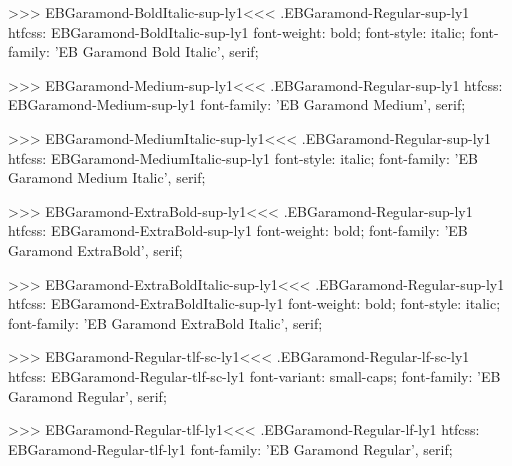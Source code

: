 {{>>>
\<EBGaramond-BoldItalic-sup-ly1\><<<
.EBGaramond-Regular-sup-ly1
htfcss:  EBGaramond-BoldItalic-sup-ly1  font-weight: bold; font-style: italic; font-family: 'EB Garamond Bold Italic', serif;

>>>
\<EBGaramond-Medium-sup-ly1\><<<
.EBGaramond-Regular-sup-ly1
htfcss:  EBGaramond-Medium-sup-ly1  font-family: 'EB Garamond Medium', serif;

>>>
\<EBGaramond-MediumItalic-sup-ly1\><<<
.EBGaramond-Regular-sup-ly1
htfcss:  EBGaramond-MediumItalic-sup-ly1  font-style: italic; font-family: 'EB Garamond Medium Italic', serif;

>>>
\<EBGaramond-ExtraBold-sup-ly1\><<<
.EBGaramond-Regular-sup-ly1
htfcss:  EBGaramond-ExtraBold-sup-ly1  font-weight: bold; font-family: 'EB Garamond ExtraBold', serif;

>>>
\<EBGaramond-ExtraBoldItalic-sup-ly1\><<<
.EBGaramond-Regular-sup-ly1
htfcss:  EBGaramond-ExtraBoldItalic-sup-ly1  font-weight: bold; font-style: italic; font-family: 'EB Garamond ExtraBold Italic', serif;

>>>
\<EBGaramond-Regular-tlf-sc-ly1\><<<
.EBGaramond-Regular-lf-sc-ly1
htfcss:  EBGaramond-Regular-tlf-sc-ly1  font-variant: small-caps; font-family: 'EB Garamond Regular', serif;

>>>
\<EBGaramond-Regular-tlf-ly1\><<<
.EBGaramond-Regular-lf-ly1
htfcss:  EBGaramond-Regular-tlf-ly1  font-family: 'EB Garamond Regular', serif;

}}
